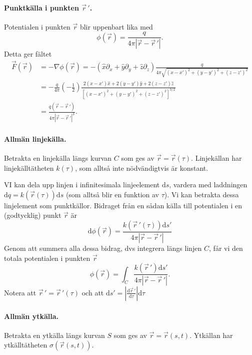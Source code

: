 \documentclass[%
oneside,                 %
final,                   %
10pt]{article}
\begin{document}
\paragraph{Punktkälla i punkten $\vec{r}\,'$.}
Potentialen i punkten $\vec{r}$ blir uppenbart lika med
\begin{equation}
  \phi(\vec{r}) = \frac{q}{4 \pi \left| \vec{r} - \vec{r}\,' \right|}.
\end{equation}
Detta ger fältet
\begin{align}
  \vec{F}(\vec{r}) &= -\nabla \phi(\vec{r}) = - \left( \hat{x}\partial_x + \hat{y}\partial_y + \hat{z}\partial_z \right) \frac{q}{4 \pi \sqrt{(x-x')^2 + (y-y')^2 + (z-z')^2}} \nonumber \\ 
  &= - \frac{q}{4 \pi} \left( -\frac{1}{2} \right) \frac{ 2(x-x')\hat{x} + 2(y-y')\hat{y} + 2(z-z')\hat{z}}{ \left[ (x-x')^2 + (y-y')^2 + (z-z')^2 \right]^{3/2}} \nonumber \\ 
  &= \frac{q (\vec{r} - \vec{r}\,' )}{4 \pi \left| \vec{r} - \vec{r}\,' \right|^3}.
\end{align}

\paragraph{Allmän linjekälla.}
Betrakta en linjekälla längs kurvan $C$ som ges av $\vec{r} = \vec{r}(\tau)$. Linjekällan har linjekälltätheten $k(\tau)$, som alltså inte nödvändigtvis är konstant.

VI kan dela upp linjen i infinitesimala linjeelement $\mbox{d}s$, vardera med laddningen $\mbox{d}q = k\left(\vec{r}(\tau)\right) \mbox{d}s$ (som alltså blir en funktion av $\tau$). Vi kan betrakta dessa linjelement som punktkällor. Bidraget från en sådan källa till potentialen i en (godtycklig) punkt $\vec{r}$ är
\begin{equation}
\mbox{d}\phi(\vec{r}) = \frac{k\left(\vec{r}\,'(\tau)\right) \mbox{d}s'}{4 \pi \left| \vec{r} - \vec{r}\,' \right|}
\end{equation}
Genom att summera alla dessa bidrag, dvs integrera längs linjen $C$, får vi den totala potentialen i punkten $\vec{r}$
\begin{equation}
\phi(\vec{r}) = \int_C \frac{k\left(\vec{r}\,'\right) \mbox{d}s'}{4 \pi \left| \vec{r} - \vec{r}\,' \right|}.
\end{equation}
Notera att $\vec{r}\,' = \vec{r}\,'(\tau)$ och att $\mbox{d}s' = \left| \frac{\mbox{d}\vec{r}\,'}{\mbox{d}\tau} \right| \mbox{d}\tau$

\paragraph{Allmän ytkälla.}
Betrakta en ytkälla längs kurvan $S$ som ges av $\vec{r} = \vec{r}(s,t)$. Ytkällan har ytkälltätheten $\sigma\left( \vec{r}(s,t) \right)$.
\end{document}
